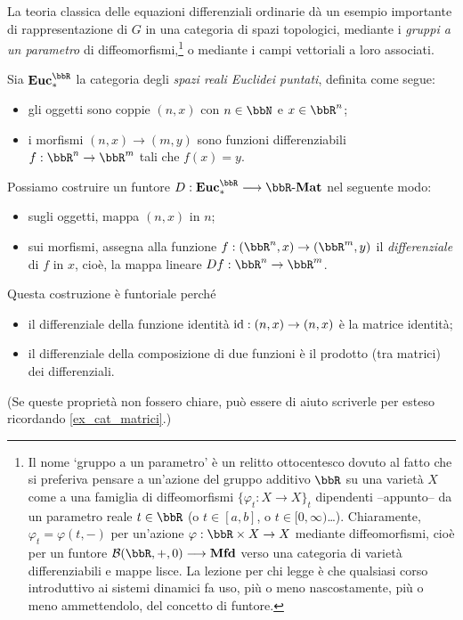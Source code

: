 La teoria classica delle equazioni differenziali ordinarie dà un esempio importante di rappresentazione di \(G\) in una categoria di spazi topologici, mediante i \emph{gruppi a un parametro} di diffeomorfismi,\footnote{Il nome `gruppo a un parametro' è un relitto ottocentesco dovuto al fatto che si preferiva pensare a un'azione del gruppo additivo \(\bbR\) su una varietà \(X\) come a una famiglia di diffeomorfismi \(\{\varphi_t : X\to X\}_t\) dipendenti --appunto-- da un parametro reale \(t\in\bbR\) (o \(t\in [a,b]\), o \(t\in [0,\infty)\)\dots). Chiaramente, \(\varphi_t = \varphi(t,-)\) per un'azione \(\varphi : \bbR\times X\to X\) mediante diffeomorfismi, cioè per un funtore \(\susp(\bbR,+,0)\fun\cate{Mfd}\) verso una categoria di varietà differenziabili e mappe lisce. La lezione per chi legge è che qualsiasi corso introduttivo ai sistemi dinamici fa uso, più o meno nascostamente, più o meno ammettendolo, del concetto di funtore.} o mediante i campi vettoriali a loro associati.
\begin{example}\label{exa_derivata_funtore}
	Sia \(\ctEuc\) la categoria degli \emph{spazi reali Euclidei puntati}, definita come segue:
	\begin{itemize}
		\item gli oggetti sono coppie \((n,x)\) con \(n\in\bbN\) e \(x\in\bbR^n\);
		\item i morfismi \((n,x)\to (m,y)\) sono funzioni differenziabili \(f:\bbR^n\to\bbR^m\) tali che \(f(x)=y\).
	\end{itemize}
	Possiamo costruire un funtore \(D:\ctEuc \fun \ctMat[\bbR]\) nel seguente modo:
	\begin{itemize}
		\item sugli oggetti, mappa \((n,x)\) in \(n\);
		\item sui morfismi, assegna alla funzione \(f:(\bbR^n,x)\to (\bbR^m,y)\) il \emph{differenziale} di \(f\) in \(x\), cioè, la mappa lineare \(Df:\bbR^n\to\bbR^m\).
	\end{itemize}
	Questa costruzione è funtoriale perché
	\begin{itemize}
		\item il differenziale della funzione identità \(\mathrm{id} : (n,x) \to (n,x)\) è la matrice identità;
		\item il differenziale della composizione di due funzioni è il prodotto (tra matrici) dei differenziali.
	\end{itemize}
	(Se queste proprietà non fossero chiare, può essere di aiuto scriverle per esteso ricordando \ref{ex_cat_matrici}.)
\end{example}
